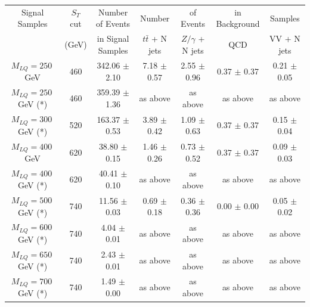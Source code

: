 \begin{table}[htbp]
\begin{center}
\begin{tabular}{|ccc||cccc|}
\hline\hline
Signal Samples       & $S_T$ cut       & Number of Events     & Number              & of Events           & in Background    & Samples     \\
                     & (GeV)           & in Signal Samples     & $t\bar{t}$ + N jets & $Z/\gamma$ + N jets & QCD              & VV + N jets \\ 
\hline
$M_{LQ}=250~$GeV     & 460             & 342.06 $\pm$ 2.10    & 7.18  $\pm$ 0.57    & 2.55  $\pm$ 0.96    & 0.37 $\pm$ 0.37  & 0.21 $\pm$ 0.05 \\ 
$M_{LQ}=250~$GeV (*) & 460             & 359.39 $\pm$ 1.36    & as above            & as above            & as above         & as above        \\
$M_{LQ}=300~$GeV (*) & 520             & 163.37 $\pm$ 0.53    & 3.89  $\pm$ 0.42    & 1.09  $\pm$ 0.63    & 0.37 $\pm$ 0.37  & 0.15 $\pm$ 0.04 \\ 
$M_{LQ}=400~$GeV     & 620             &  38.80 $\pm$ 0.15    & 1.46  $\pm$ 0.26    & 0.73  $\pm$ 0.52    & 0.37 $\pm$ 0.37  & 0.09 $\pm$ 0.03 \\ 
$M_{LQ}=400~$GeV (*) & 620             &  40.41 $\pm$ 0.10    & as above            & as above            & as above         & as above        \\
$M_{LQ}=500~$GeV (*) & 740             &  11.56 $\pm$ 0.03    & 0.69  $\pm$ 0.18    & 0.36  $\pm$ 0.36    & 0.00 $\pm$ 0.00  & 0.05 $\pm$ 0.02 \\ 
$M_{LQ}=600~$GeV (*) & 740             &   4.04 $\pm$ 0.01    & as above            & as above            & as above         & as above        \\
$M_{LQ}=650~$GeV (*) & 740             &   2.43 $\pm$ 0.01    & as above            & as above            & as above         & as above        \\
$M_{LQ}=700~$GeV (*) & 740             &   1.49 $\pm$ 0.00    & as above            & as above            & as above         & as above        \\

\end{tabular}
\end{center}
\end{table}
